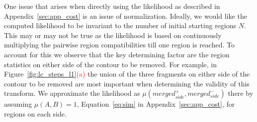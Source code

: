 One issue that arises when directly using the likelihood as described in Appendix~\ref{sec:app_cost} is an issue of normalization. Ideally, we would like the computed likelihood to be invariant to the number of initial starting regions $N$. This may or may not be true as the likelihood is based on continuously multiplying the pairwise region compatibilities till one region is reached. To account for this we observe that the key determining factor are the region statistics on either side of the contour to be removed. For example, in Figure~\ref{fig:lc_steps_l1}\textcolor{red}{(a)} the union of the three fragments on either side of the contour to be removed are most important when determining the validity of this transform. We approximate the likelihood as $\mu(merged_{side}^+,merged_{side}^-)$ there by assuming $\mu(A,B)=1$, Equation~\ref{eq:sim} in Appendix~\ref{sec:app_cost}, for regions on each side. 




